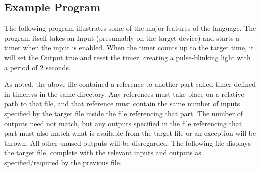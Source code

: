 \subsection{Example Program}

The following program illustrates some of the major features of the language. The
program itself takes an Input (presumably on the target device) and starts a
timer when the input is enabled. When the timer counts up to the target time, it
will set the Output true and reset the timer, creating a pulse-blinking light
with a period of 2 seconds.


As noted, the above file contained a reference to another part called timer defined
in timer.vs in the same directory. Any references must take place on a relative path
to that file, and that reference must contain the same number of inputs specified by
the target file inside the file referencing that part. The number of outputs need
not match, but any outputs specified in the file referencing that part must also
match what is available from the target file or an exception will be thrown. All
other unused outputs will be disregarded. The following file displays the target
file, complete with the relevant inputs and outputs as specified/required by the
previous file.

